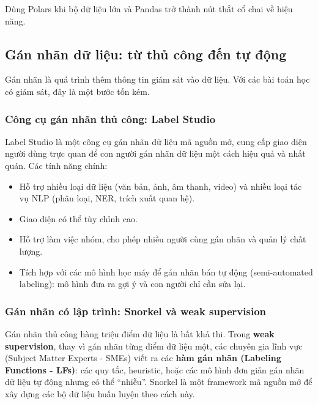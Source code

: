 Dùng Polars khi bộ dữ liệu lớn và Pandas trở thành nút thắt cổ chai về hiệu năng.

\subsection{Gán nhãn dữ liệu: từ thủ công đến tự động}
\label{ssec:data_labeling_methods}
Gán nhãn là quá trình thêm thông tin giám sát vào dữ liệu. Với các bài toán học có giám sát, đây là một bước tốn kém.

\subsubsection{Công cụ gán nhãn thủ công: Label Studio}
Label Studio là một công cụ gán nhãn dữ liệu mã nguồn mở, cung cấp giao diện người dùng trực quan để con người gán nhãn dữ liệu một cách hiệu quả và nhất quán. Các tính năng chính:
\begin{itemize}
    \item Hỗ trợ nhiều loại dữ liệu (văn bản, ảnh, âm thanh, video) và nhiều loại tác vụ NLP (phân loại, NER, trích xuất quan hệ).
    \item Giao diện có thể tùy chỉnh cao.
    \item Hỗ trợ làm việc nhóm, cho phép nhiều người cùng gán nhãn và quản lý chất lượng.
    \item Tích hợp với các mô hình học máy để gán nhãn bán tự động (semi-automated labeling): mô hình đưa ra gợi ý và con người chỉ cần sửa lại.
\end{itemize}
\begin{center}
    \label{fig:label_studio_ner}
\end{center}

\subsubsection{Gán nhãn có lập trình: Snorkel và weak supervision}
Gán nhãn thủ công hàng triệu điểm dữ liệu là bất khả thi. Trong \textbf{weak supervision}, thay vì gán nhãn từng điểm dữ liệu một, các chuyên gia lĩnh vực (Subject Matter Experts - SMEs) viết ra các \textbf{hàm gán nhãn (Labeling Functions - LFs)}: các quy tắc, heuristic, hoặc các mô hình đơn giản gán nhãn dữ liệu tự động nhưng có thể “nhiễu”. Snorkel là một framework mã nguồn mở để xây dựng các bộ dữ liệu huấn luyện theo cách này.


